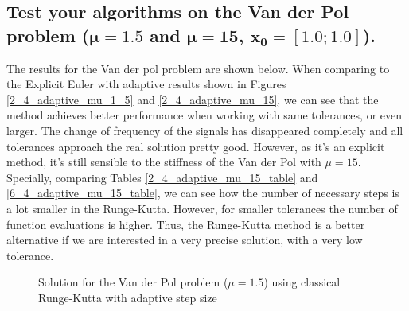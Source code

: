 \subsection{Test your algorithms on the Van der Pol problem \texorpdfstring{($\mathbf{\mu = 1.5}$ and $\mathbf{\mu = 15}$, $\mathbf{x_0 = [1.0;1.0]}$).}{(mu = 1.5 and mu = 15, x0 = [1.0;1.0]).}}
The results for the Van der pol problem are shown below. When comparing to the Explicit Euler with adaptive results shown in Figures \ref{2_4_adaptive_mu_1_5} and \ref{2_4_adaptive_mu_15}, we can see that the method achieves better performance when working with same tolerances, or even larger. The change of frequency of the signals has disappeared completely and all tolerances approach the real solution pretty good. However, as it's an explicit method, it's still sensible to the stiffness of the Van der Pol with $\mu=15$. Specially, comparing Tables \ref{2_4_adaptive_mu_15_table} and \ref{6_4_adaptive_mu_15_table}, we can see how the number of necessary steps is a lot smaller in the Runge-Kutta. However, for smaller tolerances the number of function evaluations is higher. Thus, the Runge-Kutta method is a better alternative if we are interested in a very precise solution, with a very low tolerance.

\begin{figure}[H]
    \centering
    \caption{Solution for the Van der Pol problem ($\mathit{\mu = 1.5}$) using classical Runge-Kutta with adaptive step size}
    \label{6_4_RK4_mu_1_5}
\end{figure}

